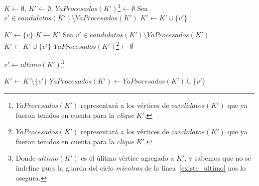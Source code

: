 \begin{pseudocodigo}
        \State $K \gets \emptyset$, $K' \gets \emptyset$, $YaProcesados(K')$\footnote{%
            $YaProcesados(K')$ representar\'a a los v\'ertices de $candidatos(K')$ que
            ya fueron tenidos en cuenta para la \emph{clique} $K'$.}$ \gets \emptyset$
                \State Sea $v' \in candidatos(K') \setminus YaProcesados(K')$
                \State $K' \gets K' \cup \{v'\}$


            \State $K' \gets \{v\}$
            \label{existe_ultimo}
                    \State $K \gets K'$
                    \State Sea $v' \in candidatos(K') \setminus YaProcesados(K')$
                    \State $K' \gets K' \cup \{v'\}$
                    \State $YaProcesados(K')$\footnote{$YaProcesados(K')$ representar\'a a
                        los v\'ertices de $candidatos(K')$ que ya fueron tenidos en cuenta
                        para la \emph{clique} $K'$.}$ \gets \emptyset$

                \Else {}
                    \State $v' \gets ultimo(K')$\footnote{Donde $ultimo(K')$
                        es el \'ulitmo v\'ertice agregado a $K'$, y sabemos que no se
                        indefine pues la guarda del ciclo \emph{mientras} de la
                        l\'inea~\ref{existe_ultimo} nos lo asegura.}

                    \State $K' \gets K' \setminus \{v'\}$
                    \State $YaProcesados(K') \gets YaProcesados(K') \cup \{v'\}$

                \EndIf
            \EndWhile
        \EndFor
    \EndIf

    \State {}
\end{pseudocodigo}
